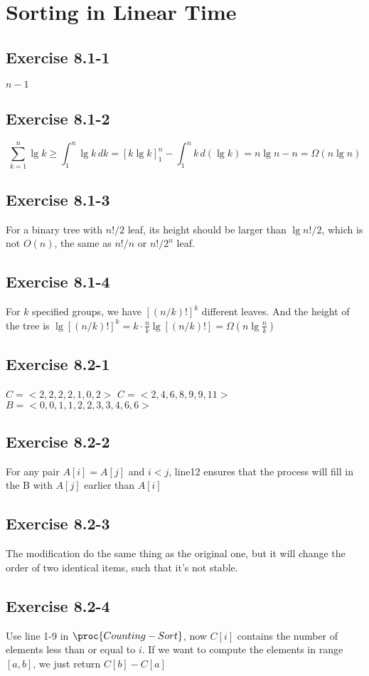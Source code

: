 \documentclass[12pt]{article}
\theoremstyle{definition}
\theoremstyle{remark}
\begin{document}
\section{Sorting in Linear Time}
\subsection*{Exercise 8.1-1}
$n-1$
\subsection*{Exercise 8.1-2}
\[\sum_{k=1}^n\lg{k}\ge\int_1^n \lg{k}\,dk=[k\lg{k}]_1^n-\int_1^n k\,d(\lg{k})=n\lg{n}-n=\Omega(n\lg{n})\]
\subsection*{Exercise 8.1-3}
For a binary tree with $n!/2$ leaf, its height should be larger than $\lg{n!/2}$, which is not $O(n)$, the same as $n!/n$ or $n!/{2^n}$ leaf.
\subsection*{Exercise 8.1-4}
For $k$ specified groups, we have $[(n/k)!]^k$ different leaves. And the height of the tree is $\lg{[(n/k)!]^k}=k\cdot\frac{n}{k}\lg{[(n/k)!]}=\Omega(n\lg\frac{n}{k})$
\subsection*{Exercise 8.2-1}
$C=<2,2,2,2,1,0,2>$
$C=<2,4,6,8,9,9,11>$
$B=<0,0,1,1,2,2,3,3,4,6,6>$
\subsection*{Exercise 8.2-2}
For any pair $A[i]=A[j]$ and $i<j$, line12 ensures that the process will fill in the B with $A[j]$ earlier than $A[i]$
\subsection*{Exercise 8.2-3}
The modification do the same thing as the original one, but it will change the order of two identical items, such that it's not stable.
\subsection*{Exercise 8.2-4}
Use line 1-9 in $\proc{Counting-Sort}$, now $C[i]$ contains the number of elements less than or equal to $i$. If we want to compute the elements in range $[a,b]$, we just return $C[b]-C[a]$
\end{document}
